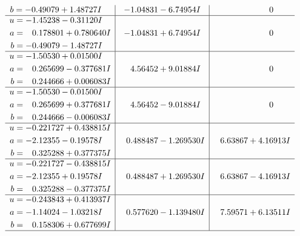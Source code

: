 \documentclass[1p]{elsarticle_modified}
\theoremstyle{definition}
\begin{document}
$$\begin{array}{c|c|c}
\begin{aligned}
b &= -0.49079 + 1.48727 I\end{aligned}
 & -1.04831 - 6.74954 I & \phantom{-0.000000 } 0 \\ \hline\begin{aligned}
u &= -1.45238 - 0.31120 I \\
a &= \phantom{-}0.178801 + 0.780640 I \\
b &= -0.49079 - 1.48727 I\end{aligned}
 & -1.04831 + 6.74954 I & \phantom{-0.000000 } 0 \\ \hline\begin{aligned}
u &= -1.50530 + 0.01500 I \\
a &= \phantom{-}0.265699 - 0.377681 I \\
b &= \phantom{-}0.244666 + 0.006083 I\end{aligned}
 & \phantom{-}4.56452 + 9.01884 I & \phantom{-0.000000 } 0 \\ \hline\begin{aligned}
u &= -1.50530 - 0.01500 I \\
a &= \phantom{-}0.265699 + 0.377681 I \\
b &= \phantom{-}0.244666 - 0.006083 I\end{aligned}
 & \phantom{-}4.56452 - 9.01884 I & \phantom{-0.000000 } 0 \\ \hline\begin{aligned}
u &= -0.221727 + 0.438815 I \\
a &= -2.12355 - 0.19578 I \\
b &= \phantom{-}0.325288 + 0.377375 I\end{aligned}
 & \phantom{-}0.488487 - 1.269530 I & \phantom{-}6.63867 + 4.16913 I \\ \hline\begin{aligned}
u &= -0.221727 - 0.438815 I \\
a &= -2.12355 + 0.19578 I \\
b &= \phantom{-}0.325288 - 0.377375 I\end{aligned}
 & \phantom{-}0.488487 + 1.269530 I & \phantom{-}6.63867 - 4.16913 I \\ \hline\begin{aligned}
u &= -0.243843 + 0.413937 I \\
a &= -1.14024 - 1.03218 I \\
b &= \phantom{-}0.158306 + 0.677699 I\end{aligned}
 & \phantom{-}0.577620 - 1.139480 I & \phantom{-}7.59571 + 6.13511 I\\
 \hline 
 \end{array}$$\newpage$$\begin{array}{c|c|c}  

\end{array}$$
\end{document}
